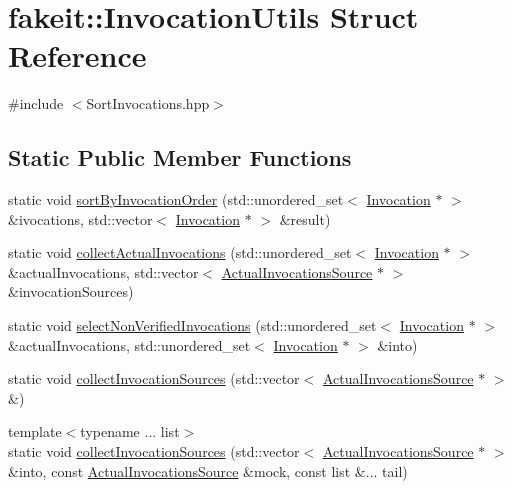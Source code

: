 \hypertarget{structfakeit_1_1InvocationUtils}{}\section{fakeit\+::Invocation\+Utils Struct Reference}
\label{structfakeit_1_1InvocationUtils}


{\ttfamily \#include $<$Sort\+Invocations.\+hpp$>$}

\subsection*{Static Public Member Functions}
\begin{DoxyCompactItemize}
\item 
static void \mbox{\hyperlink{structfakeit_1_1InvocationUtils_a0badf7e54dd25b44d90b174d6ac39fa3}{sort\+By\+Invocation\+Order}} (std\+::unordered\+\_\+set$<$ \mbox{\hyperlink{structfakeit_1_1Invocation}{Invocation}} $\ast$ $>$ \&ivocations, std\+::vector$<$ \mbox{\hyperlink{structfakeit_1_1Invocation}{Invocation}} $\ast$ $>$ \&result)
\item 
static void \mbox{\hyperlink{structfakeit_1_1InvocationUtils_a0bb553d912e1d41f5fc1cf2d16ae9e55}{collect\+Actual\+Invocations}} (std\+::unordered\+\_\+set$<$ \mbox{\hyperlink{structfakeit_1_1Invocation}{Invocation}} $\ast$ $>$ \&actual\+Invocations, std\+::vector$<$ \mbox{\hyperlink{structfakeit_1_1ActualInvocationsSource}{Actual\+Invocations\+Source}} $\ast$ $>$ \&invocation\+Sources)
\item 
static void \mbox{\hyperlink{structfakeit_1_1InvocationUtils_a333ea33ae42d98d58c0cf5cbb9a1d3cb}{select\+Non\+Verified\+Invocations}} (std\+::unordered\+\_\+set$<$ \mbox{\hyperlink{structfakeit_1_1Invocation}{Invocation}} $\ast$ $>$ \&actual\+Invocations, std\+::unordered\+\_\+set$<$ \mbox{\hyperlink{structfakeit_1_1Invocation}{Invocation}} $\ast$ $>$ \&into)
\item 
static void \mbox{\hyperlink{structfakeit_1_1InvocationUtils_abf6eefccad9f9e43592a11ed5772c2ab}{collect\+Invocation\+Sources}} (std\+::vector$<$ \mbox{\hyperlink{structfakeit_1_1ActualInvocationsSource}{Actual\+Invocations\+Source}} $\ast$ $>$ \&)
\item 
{\footnotesize template$<$typename ... list$>$ }\\static void \mbox{\hyperlink{structfakeit_1_1InvocationUtils_aa88116bb054d94ddc8a3a942f5fc3dd2}{collect\+Invocation\+Sources}} (std\+::vector$<$ \mbox{\hyperlink{structfakeit_1_1ActualInvocationsSource}{Actual\+Invocations\+Source}} $\ast$ $>$ \&into, const \mbox{\hyperlink{structfakeit_1_1ActualInvocationsSource}{Actual\+Invocations\+Source}} \&mock, const list \&... tail)

\end{DoxyCompactItemize}
